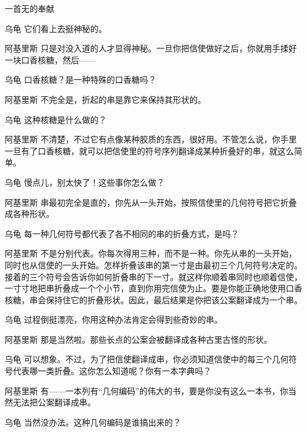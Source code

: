 \begin{dialog}{一首无的奉献\label{abcd}}
\begin{dialogue}
\item[乌龟]它们看上去挺神秘的。

\item[阿基里斯]只是对没入道的人才显得神秘。一旦你把信使做好之后，你就用手揉好一块口香核糖，然后——

\item[乌龟]口香核糖？是一种特殊的口香糖吗？

\item[阿基里斯]不完全是，折起的串是靠它来保持其形状的。

\item[乌龟]这种核糖是什么做的？

\item[阿基里斯]不清楚，不过它有点像某种胶质的东西，很好用。不管怎么说，你手里一旦有了口香核糖，就可以把信使里的符号序列翻译成某种折叠好的串，就这么简单。

\item[乌龟]慢点儿，别太快了！这些事你怎么做？

\item[阿基里斯]串最初完全是直的，你先从一头开始，按照信使里的几何符号把它折叠成各种形状。

\item[乌龟]每一种几何符号都代表了各不相同的串的折叠方式，是吗？

\item[阿基里斯]不是分别代表。你每次得用三种，而不是一种。你先从串的一头开始，同时也从信使的一头开始。怎样折叠该串的第一寸是由最初三个几何符号决定的。接着的三个符号会告诉你如何折叠串的下一寸。就这样你顺着串同时也顺着信使，一寸寸地把串折叠成一个个小节，直到你用完信使为止。要是你能正确地使用口香核糖，串会保持住它的折叠形状。因此，最后结果是你把该公案翻译成为一个串。

\item[乌龟]过程倒挺漂亮，你用这种办法肯定会得到些奇妙的串。

\item[阿基里斯]那是当然啦。那些长点的公案会被翻译成各种古里古怪的形状。

\item[乌龟]可以想象。不过，为了把信使翻译成串，你必须知道信使中的每三个几何符号代表哪一类折叠。这你怎么知道呢？你有一本字典吗？

\item[阿基里斯]有——一本列有“几何编码”的伟大的书，要是你没有这么一本书，你当然无法把公案翻译成串。

\item[乌龟]当然没办法。这种几何编码是谁搞出来的？


\end{dialogue}
\end{dialog}
